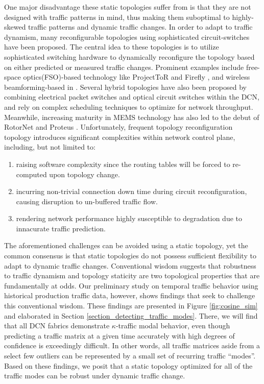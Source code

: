 \documentclass[sigconf]{acmart}
\theoremstyle{definition}
\begin{document}
One major disadvantage these static topologies suffer from is that they are not designed with traffic patterns in mind, thus making them suboptimal to highly-skewed traffic patterns and dynamic traffic changes. In order to adapt to traffic dynamism, many reconfigurable topologies using sophisticated circuit-switches \cite{vahdat2011emerging, liu2010scaling, fields2010transceivers, zhou2017datacenter} have been proposed. The central idea to these topologies is to utilize sophisticated switching hardware to dynamically reconfigure the topology based on either predicted or measured traffic changes. Prominent examples include free-space optics(FSO)-based technology like ProjectToR \cite{ghobadi2016projector} and Firefly \cite{hamedazimi2014firefly}, and wireless beamforming-based in \cite{zhou2012mirror}. Several hybrid topologies \cite{farrington2011helios, cthrough_wang_2011, reactor_liu2014} have also been proposed by combining electrical packet switches and optical circuit switches within the DCN, and rely on complex scheduling techniques \cite{liu2015scheduling, porter2013integrating} to optimize for network throughput. Meanwhile, increasing maturity in MEMS technology has also led to the debut of RotorNet \cite{rotornet_mellette2017} and Proteus \cite{singla2010proteus}. Unfortunately, frequent topology reconfiguration topology introduces significant complexities within network control plane, including, but not limited to:
\begin{enumerate}
    \item raising software complexity since the routing tables will be forced to re-computed upon topology change.
    \item incurring non-trivial connection down time during circuit reconfiguration, causing disruption to un-buffered traffic flow.
    \item rendering network performance highly susceptible to degradation due to innacurate traffic prediction.
\end{enumerate}

The aforementioned challenges can be avoided using a static topology, yet the common consensus is that static topologies do not possess sufficient flexibility to adapt to dynamic traffic changes. Conventional wisdom suggests that robustness to traffic dynamism and topology staticity are two topological properties that are fundamentally at odds. Our preliminary study on temporal traffic behavior using historical production traffic data, however, shows findings that seek to challenge this conventional wisdom. These findings are presented in Figure \ref{fig:cosine_sim} and elaborated in Section \ref{section_detecting_traffic_modes}. There, we will find that all DCN fabrics demonstrate $\kappa$-traffic modal behavior, even though predicting a traffic matrix at a given time accurately with high degrees of confidence is exceedingly difficult. In other words, all traffic matrices aside from a select few outliers can be represented by a small set of recurring traffic ``modes''. Based on these findings, we posit that a static topology optimized for all of the traffic modes can be robust under dynamic traffic change. 
\end{document}
